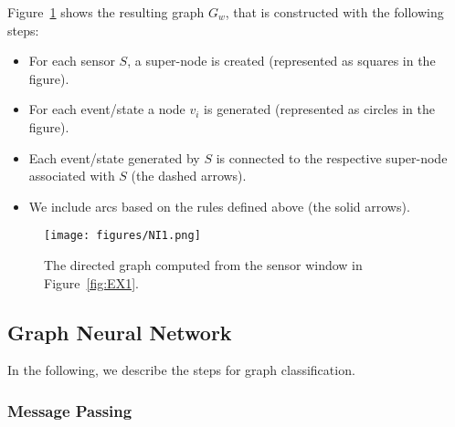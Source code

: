 Figure~\ref{fig:EX2} shows the resulting graph $G_w$, that is constructed with the following steps:
\begin{itemize}
    \item For each sensor $S$, a super-node is created (represented as squares in the figure).
    \item For each event/state a node $v_i$ is generated (represented as circles in the figure).
    \item Each event/state generated by $S$ is connected to the respective super-node associated with $S$ (the dashed arrows).
    \item We include arcs based on the rules defined above (the solid arrows).
    
\end{itemize}

\begin{figure}
    \centering
    \texttt{[image: figures/NI1.png]}
    \caption[Graph construction example 2]{The directed graph computed from the sensor window in Figure~\ref{fig:EX1}. } 

    \label{fig:EX2}
\end{figure}

\subsection{Graph Neural Network}

In the following, we describe the steps for graph classification.

\subsubsection{Message Passing}

